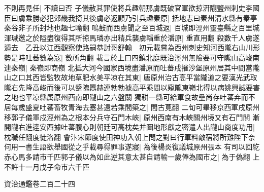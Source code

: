 不則再見任|{
	不讀曰否}
子儀赦其罪使將兵趣朝那虜既破官軍欲掠汧隴鹽州刺史李國臣曰虜乘勝必犯郊畿我掎其後虜必返顧乃引兵趣秦原|{
	括地志曰秦州清水縣有秦亭秦谷非子所封地也趣七喻翻}
鳴鼔而西虜聞之至百城返|{
	百城即涇州靈臺縣之百里城}
渾瑊邀之於隘盡復得其所掠馬璘亦出精兵襲虜輜重於潘原|{
	重直用翻}
殺數千人虜遂遁去　乙丑以江西觀察使路嗣恭討哥舒翰　初元載嘗為西州刺史知河西隴右山川形勢是時吐蕃數為寇|{
	數所角翻}
載言於上曰四鎮北庭既治涇州無險要可守隴山高峻南連秦嶺|{
	秦嶺即商嶺}
北抵大河今國家西境盡潘原而吐蕃戍摧沙堡原州居其中間當隴山之口其西皆監牧故地草肥水美平凉在其東|{
	唐原州治古高平當隴道之要漢光武取隴右先降高峻而後可以蹙隗囂赫連勃勃據高平乘間以窺隴東嶺北得以病姚興誠要害之地也平凉縣属原州西南即隴山之六盤關}
獨耕一縣可給軍食故壘尚存吐蕃弃而不居每歲盛夏吐蕃畜牧青海去塞甚遠若乘間築之|{
	間古莧翻}
二旬可畢移京西軍戌原州移郭子儀軍戍涇州為之根本分兵守石門木峽|{
	原州西南有木峽關州境又有石門關}
漸開隴右進逹安西據吐蕃腹心則朝廷可高枕矣并圖地形獻之密遣人出隴山商度功用|{
	枕職任翻度徒洛翻}
會汴宋節度使田神功入朝上問之對曰行軍料敵宿將所難陛下奈何用一書生語欲舉國從之乎載尋得罪事遂寢|{
	為後楊炎復議城原州張本}
有司以回紇赤心馬多請市千匹郭子儀以為如此逆其意太甚自請輸一歲俸為國市之|{
	為于偽翻}
上不許十一月戊子命市六千匹

資治通鑑卷二百二十四
